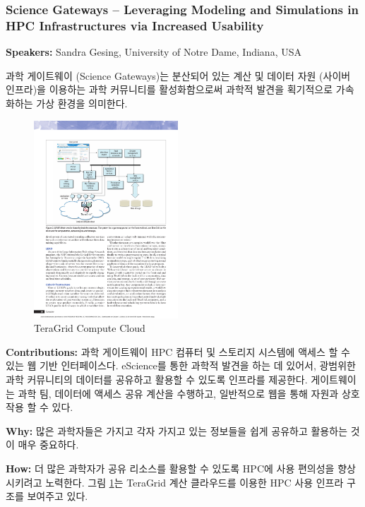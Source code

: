 \documentclass[twocolumn]{article}
\begin{document}
\subsubsection{Science Gateways – Leveraging Modeling and Simulations in HPC Infrastructures via Increased Usability}
\textbf{Speakers:} Sandra Gesing, University of Notre Dame, Indiana, USA

과학 게이트웨이 (Science Gateways)는 분산되어 있는 계산 및 데이터 자원 (사이버 인프라)을 이용하는 과학 커뮤니티를 활성화함으로써 과학적 발견을 획기적으로 가속화하는 가상 환경을 의미한다.

\begin{figure}[htb]
        \centering
        \includegraphics[width=0.48\textwidth]{teragrid-compute-cloud.pdf}
        \caption{TeraGrid Compute Cloud}
        \label{fig:teragrid-compute-cloud}
\end{figure}

\noindent
\textbf{Contributions:}  과학 게이트웨이 HPC 컴퓨터 및 스토리지 시스템에 액세스 할 수 있는 웹 기반 인터페이스다.
eScience를 통한 과학적 발견을 하는 데 있어서, 광범위한 과학 커뮤니티의 데이터를 공유하고 활용할 수 있도록 인프라를 제공한다.
게이트웨이는 과학 팀, 데이터에 액세스 공유 계산을 수행하고, 일반적으로 웹을 통해 자원과 상호 작용 할 수 있다. 

\noindent
\textbf{Why:}  많은 과학자들은 가지고 각자 가지고 있는 정보들을 쉽게 공유하고 활용하는 것이 매우 중요하다.

\noindent
\textbf{How:}  더 많은 과학자가 공유 리소스를 활용할 수 있도록 HPC에 사용 편의성을 향상 시키려고 노력한다.
그림 \ref{fig:teragrid-compute-cloud}는 TeraGrid 계산 클라우드를 이용한 HPC 사용 인프라 구조를 보여주고 있다.
\end{document}
